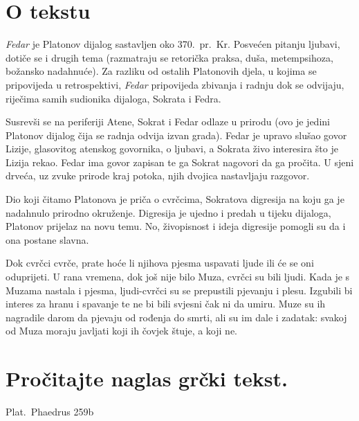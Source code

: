 


\section*{O tekstu}

\textit{Fedar} je Platonov dijalog sastavljen oko 370.\ pr.~Kr. Posvećen pitanju ljubavi, dotiče se i drugih tema (razmatraju se retorička praksa, duša, metempsihoza, božansko nadahnuće). Za razliku od ostalih Platonovih djela, u kojima se pripovijeda u retrospektivi, \textit{Fedar} pripovijeda zbivanja i radnju dok se odvijaju, riječima samih sudionika dijaloga, Sokrata i Fedra.

Susrevši se na periferiji Atene, Sokrat i Fedar odlaze u prirodu (ovo je jedini Platonov dijalog čija se radnja odvija izvan grada). Fedar je upravo slušao govor Lizije, glasovitog atenskog govornika, o ljubavi, a Sokrata živo interesira što je Lizija rekao. Fedar ima govor zapisan te ga Sokrat nagovori da ga pročita. U sjeni drveća, uz zvuke prirode kraj potoka, njih dvojica nastavljaju razgovor. 

Dio koji čitamo Platonova je priča o cvrčcima, Sokratova digresija na koju ga je nadahnulo prirodno okruženje. Digresija je ujedno i predah u tijeku dijaloga, Platonov prijelaz na novu temu. No, živopisnost i ideja digresije pomogli su da i ona postane slavna. 

Dok cvrčci cvrče, prate hoće li njihova pjesma uspavati ljude ili će se oni oduprijeti. U rana vremena, dok još nije bilo Muza, cvrčci su bili ljudi. Kada je s Muzama nastala i pjesma, ljudi-cvrčci su se prepustili pjevanju i plesu. Izgubili bi interes za hranu i spavanje te ne bi bili svjesni čak ni da umiru. Muze su ih nagradile darom da pjevaju od rođenja do smrti, ali su im dale i zadatak: svakoj od Muza moraju javljati koji ih čovjek štuje, a koji ne.


\newpage

\section*{Pročitajte naglas grčki tekst.}

Plat.\ Phaedrus 259b


\medskip



